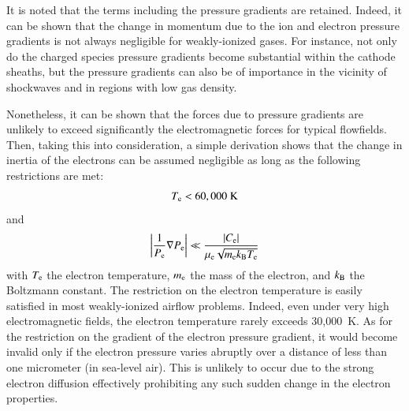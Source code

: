 \documentclass{warpdoc}
\begin{document}
It is noted that the terms including the pressure gradients are retained. Indeed, it can  be shown that the change in momentum due to the ion and electron pressure gradients is not always negligible for weakly-ionized gases. For instance, not only do the charged species pressure gradients become substantial within the cathode sheaths, but the pressure gradients can also be of importance in the vicinity of shockwaves and in regions with low gas density. 

Nonetheless, it can be shown that the forces due to pressure gradients are unlikely to exceed significantly the electromagnetic forces for typical flowfields. Then, taking this into consideration, a simple derivation shows that the change in inertia of the electrons can be assumed negligible as long as the following restrictions are met: 
%
\begin{equation}
T_{\rm e} < 60,000 ~{\rm K}
\end{equation}   
%
and
%
\begin{equation}
\left| \frac{1}{P_{\rm e}} \nabla P_{\rm e}\right| \ll \frac{|C_{\rm e}|}{\mu_{\rm e} \sqrt{ m_{\rm e}  k_{\rm B} T_{\rm e}}} 
\end{equation}   
%
with $T_{\rm e}$ the electron temperature, $m_{\rm e}$ the mass of the electron, and $k_{\rm B}$ the Boltzmann constant. The restriction on the electron temperature is easily satisfied in most weakly-ionized airflow problems. Indeed, even under very high electromagnetic fields, the electron temperature rarely exceeds 30,000~K. As for the restriction on the gradient of the electron pressure gradient, it would become invalid only if the electron pressure varies abruptly over a distance of less than one micrometer (in sea-level air). This is unlikely to occur due to the strong electron diffusion effectively prohibiting any such sudden change in the electron properties.   
\end{document}
